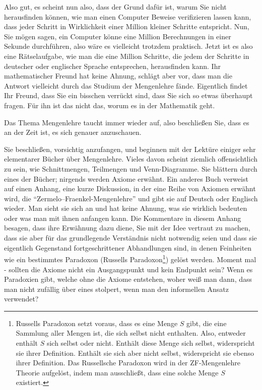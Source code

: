 Also gut, es scheint nun also, dass der Grund dafür ist, warum Sie nicht herausfinden können, wie man einen Computer Beweise verifizieren lassen kann, dass jeder Schritt in Wirklichkeit einer Million kleiner Schritte entspricht.  Nun, Sie mögen sagen, ein Computer könne eine Million Berechnungen in einer Sekunde durchführen, also wäre es vielleicht trotzdem praktisch.  Jetzt ist es also eine Rätselaufgabe, wie man die eine Million Schritte, die jedem der Schritte in deutscher oder englischer Sprache entsprechen, herausfinden kann.  Ihr mathematischer Freund hat keine Ahnung, schlägt aber vor, dass man die Antwort vielleicht durch das Studium der Mengenlehre fände.  Eigentlich findet Ihr Freund, dass Sie ein bisschen verrückt sind, dass Sie sich so etwas überhaupt fragen.  Für ihn ist das nicht das, worum es in der Mathematik geht.

Das Thema Mengenlehre taucht immer wieder auf, also beschließen Sie, dass es an der Zeit ist, es sich genauer anzuschauen.

Sie beschließen, vorsichtig anzufangen, und beginnen mit der Lektüre einiger sehr elementarer Bücher über Mengenlehre.  Vieles davon scheint ziemlich offensichtlich zu sein, wie Schnittmengen, Teilmengen und Venn-Diagramme.  Sie blättern durch eines der Bücher; nirgends werden Axiome erwähnt. Ein anderes Buch verweist auf einen Anhang, eine kurze Diskussion, in der eine Reihe von Axiomen erwähnt wird, die "`Zermelo--Fraenkel-Mengenlehre"' und gibt sie auf Deutsch oder Englisch wieder.  Man sieht sie sich an und hat keine Ahnung, was sie wirklich bedeuten oder was man mit ihnen anfangen kann.  Die Kommentare in diesem Anhang besagen, dass ihre Erwähnung dazu diene, Sie mit der Idee vertraut zu machen, dass sie aber für das grundlegende Verständnis nicht notwendig seien und dass sie eigentlich Gegenstand fortgeschrittener Abhandlungen sind, in denen Feinheiten wie ein bestimmtes Paradoxon (Russells Paradoxon\footnote{Russells Paradoxon setzt voraus, dass es eine Menge $S$ gibt, die eine Sammlung aller Mengen ist, die sich selbst nicht enthalten.  Also, entweder enthält $S$ sich selbst oder nicht.  Enthält diese Menge sich selbst, widerspricht sie ihrer Definition.  Enthält sie sich aber nicht selbst, widerspricht sie ebenso ihrer Definition.  Das Russellsche Paradoxon wird in der ZF-Mengenlehre Theorie aufgelöst, indem man ausschließt, dass eine solche Menge $S$ existiert.}) gelöst werden.  Moment mal - sollten die Axiome nicht ein Ausgangspunkt und kein Endpunkt sein?  Wenn es Paradoxien gibt, welche ohne die Axiome entstehen, woher weiß man dann, dass man nicht zufällig über eines stolpert, wenn man den informellen Ansatz verwendet?

